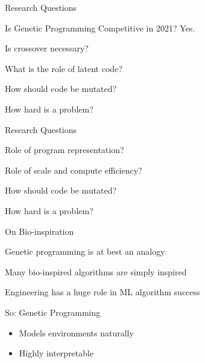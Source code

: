 \documentclass[aspectratio=169]{beamer}
\begin{document}
\begin{frame}{Research Questions}
  \begin{vfilleditems}
    \item {\Huge Is Genetic Programming Competitive in 2021? {\color{pureminimalistic@text@red} Yes.}}
    {\color{grey}
    \item {\Huge Is crossover necessary?}
    \item {\Huge What is the role of latent code?}
    \item {\Huge How should code be mutated?}
    \item {\Huge How hard is a problem?}
    }
  \end{vfilleditems}
\end{frame}

\begin{frame}{Research Questions}
  \begin{vfilleditems}
    \item {\Huge Role of program representation?}
    \item {\Huge Role of scale and compute efficiency?}
    \item {\Huge How should code be mutated?}
    \item {\Huge How hard is a problem?}
  \end{vfilleditems}
\end{frame}

\begin{frame}[plain]{On Bio-inspiration}
    \begin{vfilleditems}
      \item {\Medium Genetic programming is at best an analogy}
      \item {\Medium Many bio-inspired algorithms are simply inspired}
    \end{vfilleditems}
\end{frame}

\begin{frame}
    \item {\Huge Engineering has a huge role in ML algorithm success}
    \item {\Huge So: Genetic Programming}
      \begin{itemize}
        \item {\Medium Models environments naturally}
        \item {\Medium Highly interpretable}
      \end{itemize}
\end{frame}
\end{document}

